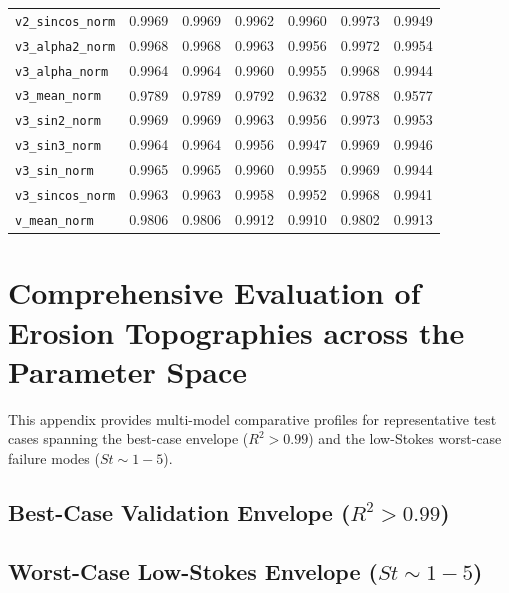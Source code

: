 \documentclass{article}
\begin{document}
\begin{longtable}{l cccccc}
\texttt{v2\_sincos\_norm} & 0.9969 & 0.9969 & 0.9962 & 0.9960 & 0.9973 & 0.9949 \\
\texttt{v3\_alpha2\_norm} & 0.9968 & 0.9968 & 0.9963 & 0.9956 & 0.9972 & 0.9954 \\
\texttt{v3\_alpha\_norm} & 0.9964 & 0.9964 & 0.9960 & 0.9955 & 0.9968 & 0.9944 \\
\texttt{v3\_mean\_norm} & 0.9789 & 0.9789 & 0.9792 & 0.9632 & 0.9788 & 0.9577 \\
\texttt{v3\_sin2\_norm} & 0.9969 & 0.9969 & 0.9963 & 0.9956 & 0.9973 & 0.9953 \\
\texttt{v3\_sin3\_norm} & 0.9964 & 0.9964 & 0.9956 & 0.9947 & 0.9969 & 0.9946 \\
\texttt{v3\_sin\_norm} & 0.9965 & 0.9965 & 0.9960 & 0.9955 & 0.9969 & 0.9944 \\
\texttt{v3\_sincos\_norm} & 0.9963 & 0.9963 & 0.9958 & 0.9952 & 0.9968 & 0.9941 \\
\texttt{v\_mean\_norm} & 0.9806 & 0.9806 & 0.9912 & 0.9910 & 0.9802 & 0.9913 \\
\end{longtable}

\section{Comprehensive Evaluation of Erosion Topographies across the Parameter Space}
\label{app:topography_gallery}

This appendix provides multi-model comparative profiles for representative test cases spanning the best-case envelope ($R^2 > 0.99$) and the low-Stokes worst-case failure modes ($St \sim 1 - 5$).

\subsection{Best-Case Validation Envelope ($R^2 > 0.99$)}

\clearpage


\clearpage

\subsection{Worst-Case Low-Stokes Envelope ($St \sim 1 - 5$)}

\clearpage


\clearpage


\clearpage


\clearpage


\clearpage


\clearpage


\clearpage


\clearpage


\clearpage


\clearpage


\clearpage


\clearpage


\clearpage


\clearpage


\clearpage


\clearpage


\clearpage
\end{document}
